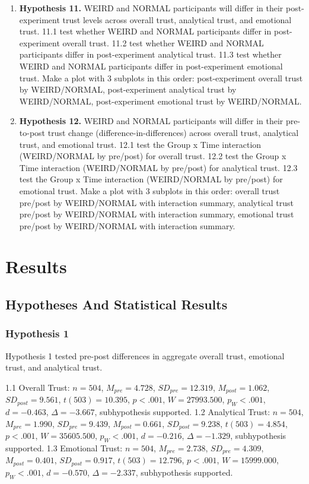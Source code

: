 \begin{enumerate}
\item \textbf{Hypothesis 11.} WEIRD and NORMAL participants will differ in their post-experiment trust levels across overall trust, analytical trust, and emotional trust.
11.1 test whether WEIRD and NORMAL participants differ in post-experiment overall trust.
11.2 test whether WEIRD and NORMAL participants differ in post-experiment analytical trust.
11.3 test whether WEIRD and NORMAL participants differ in post-experiment emotional trust.
Make a plot with 3 subplots in this order: post-experiment overall trust by WEIRD/NORMAL, post-experiment analytical trust by WEIRD/NORMAL, post-experiment emotional trust by WEIRD/NORMAL.
\item \textbf{Hypothesis 12.} WEIRD and NORMAL participants will differ in their pre-to-post trust change (difference-in-differences) across overall trust, analytical trust, and emotional trust.
12.1 test the Group x Time interaction (WEIRD/NORMAL by pre/post) for overall trust.
12.2 test the Group x Time interaction (WEIRD/NORMAL by pre/post) for analytical trust.
12.3 test the Group x Time interaction (WEIRD/NORMAL by pre/post) for emotional trust.
Make a plot with 3 subplots in this order: overall trust pre/post by WEIRD/NORMAL with interaction summary, analytical trust pre/post by WEIRD/NORMAL with interaction summary, emotional trust pre/post by WEIRD/NORMAL with interaction summary.
\end{enumerate}

\section{Results}
\subsection{Hypotheses And Statistical Results}

\subsubsection{Hypothesis 1}
Hypothesis 1 tested pre-post differences in aggregate overall trust, emotional trust, and analytical trust.

1.1 Overall Trust: $n=504$, $M_{pre}=4.728$, $SD_{pre}=12.319$, $M_{post}=1.062$, $SD_{post}=9.561$, $t(503)=10.395$, $p < .001$, $W=27993.500$, $p_{W} < .001$, $d=-0.463$, $\Delta=-3.667$, subhypothesis supported.
1.2 Analytical Trust: $n=504$, $M_{pre}=1.990$, $SD_{pre}=9.439$, $M_{post}=0.661$, $SD_{post}=9.238$, $t(503)=4.854$, $p < .001$, $W=35605.500$, $p_{W} < .001$, $d=-0.216$, $\Delta=-1.329$, subhypothesis supported.
1.3 Emotional Trust: $n=504$, $M_{pre}=2.738$, $SD_{pre}=4.309$, $M_{post}=0.401$, $SD_{post}=0.917$, $t(503)=12.796$, $p < .001$, $W=15999.000$, $p_{W} < .001$, $d=-0.570$, $\Delta=-2.337$, subhypothesis supported.

